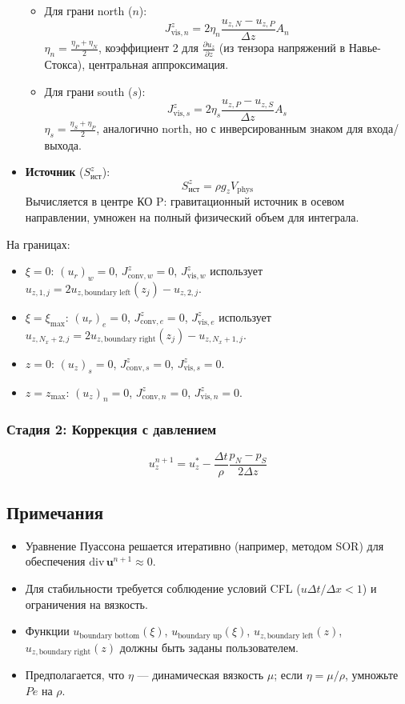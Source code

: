 \documentclass[a4paper,12pt]{article}
\begin{document}
\begin{itemize}
\begin{itemize}
        \item Для грани north (\(n\)):
        \[
        J_{\text{vis},n}^z = 2 \eta_n \frac{u_{z,N} - u_{z,P}}{\Delta z} A_n
        \]
        \(\eta_n = \frac{\eta_P + \eta_N}{2}\), коэффициент 2 для \(\frac{\partial u_z}{\partial z}\) (из тензора напряжений в Навье-Стокса), центральная аппроксимация.

        \item Для грани south (\(s\)):
        \[
        J_{\text{vis},s}^z = 2 \eta_s \frac{u_{z,P} - u_{z,S}}{\Delta z} A_s
        \]
        \(\eta_s = \frac{\eta_S + \eta_P}{2}\), аналогично north, но с инверсированным знаком для входа/выхода.
    \end{itemize}
    \item \textbf{Источник} (\(S_{\text{ист}}^z\)):
    \[
    S_{\text{ист}}^z = \rho g_z V_{\text{phys}}
    \]
    Вычисляется в центре КО P: гравитационный источник в осевом направлении, умножен на полный физический объем для интеграла.
\end{itemize}
На границах:
\begin{itemize}
    \item \(\xi = 0\): \((u_r)_w = 0\), \(J_{\text{conv},w}^z = 0\), \(J_{\text{vis},w}^z\) использует \(u_{z,1,j} = 2 u_{z,\text{boundary left}}(z_j) - u_{z,2,j}\).
    \item \(\xi = \xi_{\text{max}}\): \((u_r)_e = 0\), \(J_{\text{conv},e}^z = 0\), \(J_{\text{vis},e}^z\) использует \(u_{z,N_x+2,j} = 2 u_{z,\text{boundary right}}(z_j) - u_{z,N_x+1,j}\).
    \item \(z = 0\): \((u_z)_s = 0\), \(J_{\text{conv},s}^z = 0\), \(J_{\text{vis},s}^z = 0\).
    \item \(z = z_{\text{max}}\): \((u_z)_n = 0\), \(J_{\text{conv},n}^z = 0\), \(J_{\text{vis},n}^z = 0\).
\end{itemize}

\subsubsection*{Стадия 2: Коррекция с давлением}
\[
u_z^{n+1} = u_z^* - \frac{\Delta t}{\rho} \frac{p_N - p_S}{2 \Delta z}
\]

\subsection*{Примечания}
\begin{itemize}
    \item Уравнение Пуассона решается итеративно (например, методом SOR) для обеспечения \(\text{div} \, \mathbf{u}^{n+1} \approx 0\).
    \item Для стабильности требуется соблюдение условий CFL (\(u \Delta t / \Delta x < 1\)) и ограничения на вязкость.
    \item Функции \(u_{\text{boundary bottom}}(\xi)\), \(u_{\text{boundary up}}(\xi)\), \(u_{z,\text{boundary left}}(z)\), \(u_{z,\text{boundary right}}(z)\) должны быть заданы пользователем.
    \item Предполагается, что \(\eta\) — динамическая вязкость \(\mu\); если \(\eta = \mu / \rho\), умножьте \(Pe\) на \(\rho\).
\end{itemize}
\end{document}
